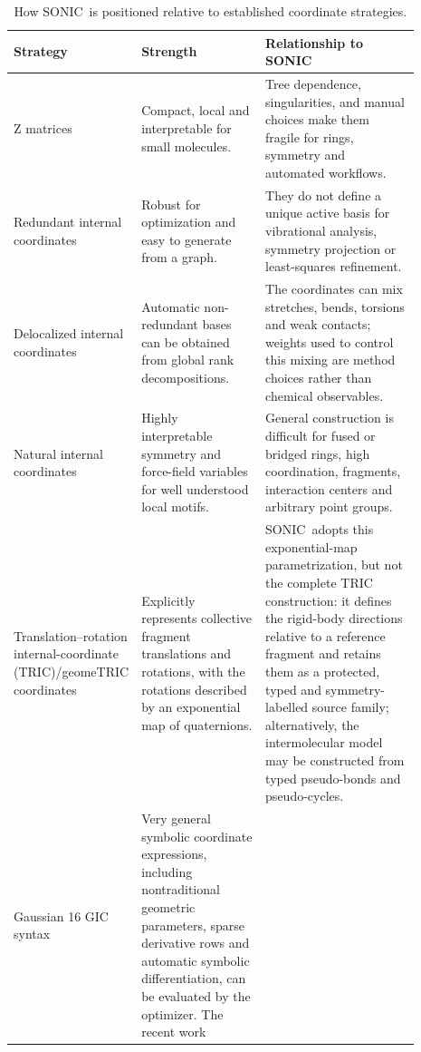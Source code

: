 \documentclass[journal=jctcce,manuscript=article,layout=traditional]{achemso}
\newcommand{\SONIC}{SONIC}
\theoremstyle{definition}
\begin{document}
\begin{table}[htbp]
\centering
\scriptsize
\setlength{\tabcolsep}{3pt}
\renewcommand{\arraystretch}{0.92}
\caption{How \SONIC\ is positioned relative to established coordinate strategies.}
\label{tab:context}
\begin{tabular}{p{0.19\linewidth}p{0.31\linewidth}p{0.39\linewidth}}
\toprule
Strategy & Strength & Relationship to \SONIC \\
\midrule
Z matrices & Compact, local and interpretable for small molecules. & Tree
dependence, singularities, and manual choices make them fragile for rings,
symmetry and automated workflows.\cite{BakerHehre1991ZMatrix} \\
\midrule
Redundant internal coordinates & Robust for optimization and easy to generate
from a graph.\cite{PulayFogarasi1992,Peng1996Redundant,BakkenHelgaker2002} &
They do not define a unique active basis for vibrational analysis, symmetry
projection or least-squares refinement. \\
\midrule
Delocalized internal coordinates & Automatic non-redundant bases can be
obtained from global rank decompositions.\cite{Baker1996Delocalized} & The
coordinates can mix stretches, bends, torsions and weak contacts; weights used
to control this mixing are method choices rather than chemical observables. \\
\midrule
Natural internal coordinates & Highly interpretable symmetry and force-field
variables for well understood local motifs.\cite{Berces1997NaturalMetal,VonArnimAhlrichs1999GNIC,SwartBickelhaupt2006StrongWeak}
& General construction is difficult for fused or bridged rings, high
coordination, fragments, interaction centers and arbitrary point groups. \\
\midrule
Translation--rotation internal-coordinate (TRIC)/geomeTRIC coordinates &
Explicitly represents collective fragment
translations and rotations, with the rotations described by an exponential map
of quaternions.\cite{WangSong2016GeomeTRIC} & \SONIC\ adopts this
exponential-map parametrization, but not the complete TRIC construction: it
defines the rigid-body directions relative to a reference fragment and retains
them as a protected, typed and symmetry-labelled source family; alternatively,
the intermolecular model may be constructed from typed pseudo-bonds and
pseudo-cycles. \\
\midrule
Gaussian 16 GIC syntax & Very general symbolic coordinate expressions, including
nontraditional geometric parameters, sparse derivative rows and automatic
symbolic differentiation, can be evaluated by the optimizer.  The recent work

\end{tabular}
\end{table}
\end{document}
